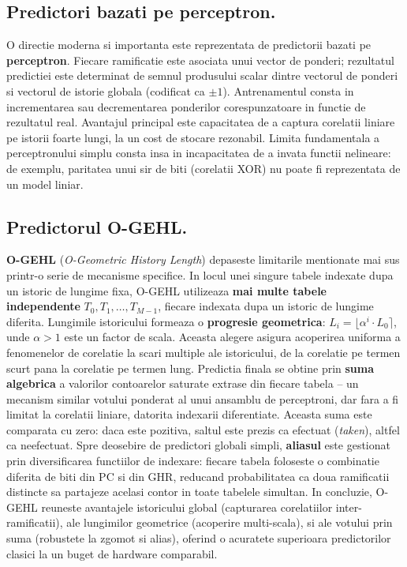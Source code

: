 \subsection*{Predictori bazati pe perceptron.}
O directie moderna si importanta este reprezentata de predictorii bazati pe \textbf{perceptron}. Fiecare ramificatie este asociata
unui vector de ponderi; rezultatul predictiei este determinat de semnul produsului scalar dintre vectorul de ponderi si vectorul de
istorie globala (codificat ca $\pm 1$). Antrenamentul consta in incrementarea sau decrementarea ponderilor corespunzatoare in functie
de rezultatul real. Avantajul principal este capacitatea de a captura corelatii liniare pe istorii foarte lungi, la un cost de stocare
rezonabil. Limita fundamentala a perceptronului simplu consta insa in incapacitatea de a invata functii nelineare: de exemplu, paritatea
unui sir de biti (corelatii XOR) nu poate fi reprezentata de un model liniar.

\subsection*{Predictorul O-GEHL.}
\textbf{O-GEHL} (\textit{O-Geometric History Length}) depaseste limitarile mentionate mai sus printr-o serie de mecanisme specifice.
In locul unei singure tabele indexate dupa un istoric de lungime fixa, O-GEHL utilizeaza \textbf{mai multe tabele independente} $T_0, T_1, \ldots, T_{M-1}$,
fiecare indexata dupa un istoric de lungime diferita. Lungimile istoricului formeaza o \textbf{progresie geometrica}: $L_i = \lfloor \alpha^i \cdot L_0 \rceil$,
unde $\alpha > 1$ este un factor de scala. Aceasta alegere asigura acoperirea uniforma a fenomenelor de corelatie la scari multiple ale
istoricului, de la corelatie pe termen scurt pana la corelatie pe termen lung. Predictia finala se obtine prin \textbf{suma algebrica}
a valorilor contoarelor saturate extrase din fiecare tabela -- un mecanism similar votului ponderat al unui ansamblu de perceptroni,
dar fara a fi limitat la corelatii liniare, datorita indexarii diferentiate. Aceasta suma este comparata cu zero: daca este pozitiva,
saltul este prezis ca efectuat (\textit{taken}), altfel ca neefectuat. Spre deosebire de predictori globali simpli, \textbf{aliasul}
este gestionat prin diversificarea functiilor de indexare: fiecare tabela foloseste o combinatie diferita de biti din PC si din GHR,
reducand probabilitatea ca doua ramificatii distincte sa partajeze acelasi contor in toate tabelele simultan. In concluzie, O-GEHL
reuneste avantajele istoricului global (capturarea corelatiilor inter-ramificatii), ale lungimilor geometrice (acoperire multi-scala),
si ale votului prin suma (robustete la zgomot si alias), oferind o acuratete superioara predictorilor clasici la un buget de hardware comparabil.

